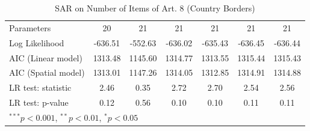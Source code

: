 \begin{table}[!h]
\begin{center}
\begin{tabular}{l c c c c c c }
Parameters              & 20           & 21           & 21           & 21           & 21           & 21           \\
Log Likelihood          & -636.51      & -552.63      & -636.02      & -635.43      & -636.45      & -636.44      \\
AIC (Linear model)      & 1313.48      & 1145.60      & 1314.77      & 1313.55      & 1315.44      & 1315.43      \\
AIC (Spatial model)     & 1313.01      & 1147.26      & 1314.05      & 1312.85      & 1314.91      & 1314.88      \\
LR test: statistic      & 2.46         & 0.35         & 2.72         & 2.70         & 2.54         & 2.56         \\
LR test: p-value        & 0.12         & 0.56         & 0.10         & 0.10         & 0.11         & 0.11         \\
\bottomrule
\multicolumn{7}{l}{\scriptsize{$^{***}p<0.001$, $^{**}p<0.01$, $^*p<0.05$}}
\end{tabular}
\caption{SAR on Number of Items of Art. 8 (Country Borders)}
\label{table:coefficients}
\end{center}
\end{table}
